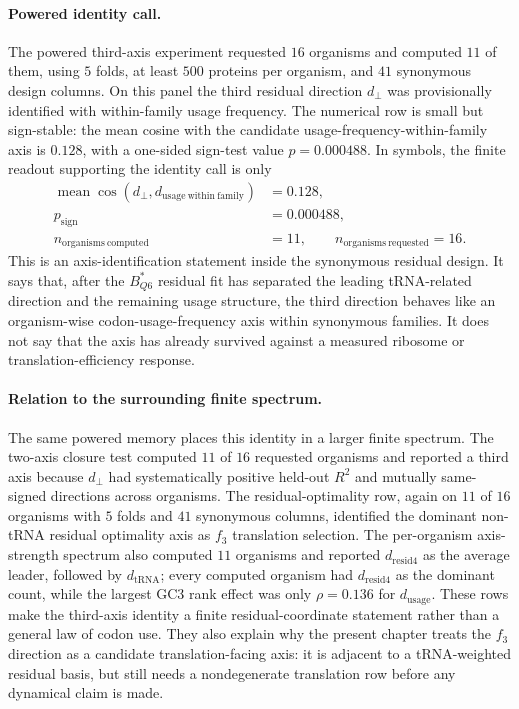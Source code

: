 \paragraph{Powered identity call.}
The powered third-axis experiment requested $16$ organisms and computed $11$ of them, using $5$ folds, at least $500$ proteins per organism, and $41$ synonymous design columns.  On this panel the third residual direction $d_\perp$ was provisionally identified with within-family usage frequency.  The numerical row is small but sign-stable: the mean cosine with the candidate usage-frequency-within-family axis is $0.128$, with a one-sided sign-test value $p=0.000488$.  In symbols, the finite readout supporting the identity call is only
$$\begin{aligned}
\operatorname{mean}\cos(d_\perp,d_{\mathrm{usage\ within\ family}}) &= 0.128,\\
p_{\mathrm{sign}} &= 0.000488,\\
n_{\mathrm{organisms\ computed}} &= 11,\qquad n_{\mathrm{organisms\ requested}}=16.
\end{aligned}$$
This is an axis-identification statement inside the synonymous residual design.  It says that, after the $B^*_{Q6}$ residual fit has separated the leading tRNA-related direction and the remaining usage structure, the third direction behaves like an organism-wise codon-usage-frequency axis within synonymous families.  It does not say that the axis has already survived against a measured ribosome or translation-efficiency response.

\paragraph{Relation to the surrounding finite spectrum.}
The same powered memory places this identity in a larger finite spectrum.  The two-axis closure test computed $11$ of $16$ requested organisms and reported a third axis because $d_\perp$ had systematically positive held-out $R^2$ and mutually same-signed directions across organisms.  The residual-optimality row, again on $11$ of $16$ organisms with $5$ folds and $41$ synonymous columns, identified the dominant non-tRNA residual optimality axis as $f_3$ translation selection.  The per-organism axis-strength spectrum also computed $11$ organisms and reported $d_{\mathrm{resid4}}$ as the average leader, followed by $d_{\mathrm{tRNA}}$; every computed organism had $d_{\mathrm{resid4}}$ as the dominant count, while the largest GC3 rank effect was only $\rho=0.136$ for $d_{\mathrm{usage}}$.  These rows make the third-axis identity a finite residual-coordinate statement rather than a general law of codon use.  They also explain why the present chapter treats the $f_3$ direction as a candidate translation-facing axis: it is adjacent to a tRNA-weighted residual basis, but still needs a nondegenerate translation row before any dynamical claim is made.

